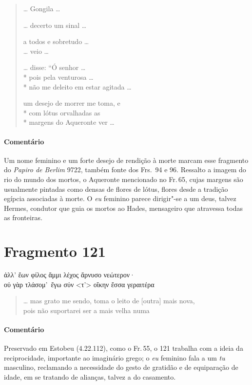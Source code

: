 \pagebreak
\begin{verse}
\ldots{} Gongila \ldots{}

\ldots{} decerto um sinal \ldots{}

a todos e sobretudo \ldots{}\\
\ldots{} veio \ldots{}

\ldots{} disse: ``Ó senhor \ldots{}\\*
pois pela venturosa \ldots{}\\*
não me deleito em estar agitada \ldots{}

um desejo de morrer me toma, e\\*
com lótus orvalhadas as\\*
margens do Aqueronte ver \ldots{}
\end{verse}

\medskip

{\paragraph{Comentário} Um nome feminino e um forte desejo de rendição à morte marcam esse fragmento do
\textit{Papiro de Berlim }9722, também fonte dos Frs.~94 e 96. Ressalto a imagem do
rio do mundo dos mortos, o Aqueronte mencionado no Fr.\,65, cujas margens são usualmente pintadas
como densas de flores de lótus, flores desde a tradição egípcia associadas à morte. O \textit{eu} feminino parece dirigir"-se a um deus,
talvez Hermes, condutor que guia os mortos ao Hades, mensageiro que atravessa todas as fronteiras.}

\pagebreak
\section{Fragmento 121}

\begin{gkverse}
ἀλλ’ ἔων φίλος ἄμμι λέχος ἄρνυσο νεώτερον·\\
οὐ γὰρ τλάσομ’ ἔγω σύν <τ’> οἴκην ἔσσα γεραιτέρα
\end{gkverse}

\begin{verse}
\ldots{} mas grato me sendo, toma o leito de [outra] mais nova,\\
pois não suportarei ser a mais velha numa 
\end{verse}

\medskip

{\paragraph{Comentário} Preservado em Estobeu (4.22.112), como o Fr.\,55, o 121 trabalha com a ideia da
reciprocidade, importante ao imaginário grego; o \textit{eu} feminino fala a um \textit{tu}
masculino, reclamando a necessidade do gesto de gratidão e de equiparação de
idade, em se tratando de alianças, talvez a do casamento.}

